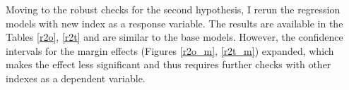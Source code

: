 \documentclass[a4paper, 12pt]{article}
\begin{document}
    
    \noindent Moving to the robust checks for the second hypothesis, I rerun the regression models with new index as a response variable. The results are available in the Tables \ref{r2o}, \ref{r2t} and are similar to the base models. However, the confidence intervals for the margin effects (Figures \ref{r2o_m}, \ref{r2t_m}) expanded, which makes the effect less significant and thus requires further checks with other indexes as a dependent variable.
    
      \begin{table}[!htbp] \centering 
  \caption{Robust check, hypothesis 2, two-ways fixed effects} 
  \label{r2t} 
\end{table}
\end{document}
